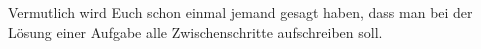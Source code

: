       Vermutlich wird Euch schon einmal jemand gesagt haben, dass man bei der Lösung einer Aufgabe alle Zwischenschritte aufschreiben soll.
